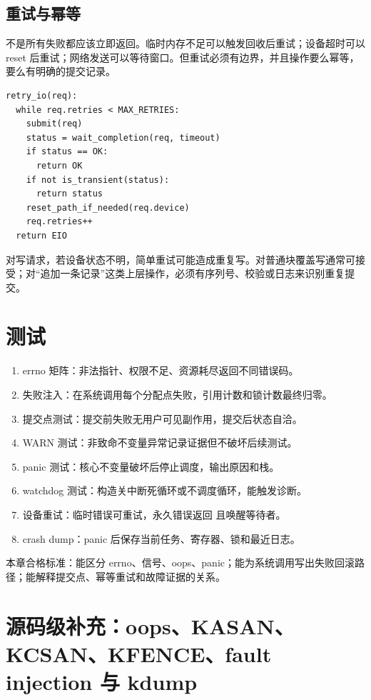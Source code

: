 \subsection{重试与幂等}

不是所有失败都应该立即返回。临时内存不足可以触发回收后重试；设备超时可以 reset 后重试；网络发送可以等待窗口。但重试必须有边界，并且操作要么幂等，要么有明确的提交记录。

\begin{lstlisting}
retry_io(req):
  while req.retries < MAX_RETRIES:
    submit(req)
    status = wait_completion(req, timeout)
    if status == OK:
      return OK
    if not is_transient(status):
      return status
    reset_path_if_needed(req.device)
    req.retries++
  return EIO
\end{lstlisting}

对写请求，若设备状态不明，简单重试可能造成重复写。对普通块覆盖写通常可接受；对“追加一条记录”这类上层操作，必须有序列号、校验或日志来识别重复提交。

\section{测试}

\begin{enumerate}
\tightlist
\item errno 矩阵：非法指针、权限不足、资源耗尽返回不同错误码。
\item 失败注入：在系统调用每个分配点失败，引用计数和锁计数最终归零。
\item 提交点测试：提交前失败无用户可见副作用，提交后状态自洽。
\item WARN 测试：非致命不变量异常记录证据但不破坏后续测试。
\item panic 测试：核心不变量破坏后停止调度，输出原因和栈。
\item watchdog 测试：构造关中断死循环或不调度循环，能触发诊断。
\item 设备重试：临时错误可重试，永久错误返回  且唤醒等待者。
\item crash dump：panic 后保存当前任务、寄存器、锁和最近日志。
\end{enumerate}

\begin{rubricbox}
本章合格标准：能区分 errno、信号、oops、panic；能为系统调用写出失败回滚路径；能解释提交点、幂等重试和故障证据的关系。
\end{rubricbox}

\section{源码级补充：oops、KASAN、KCSAN、KFENCE、fault injection 与 kdump}

